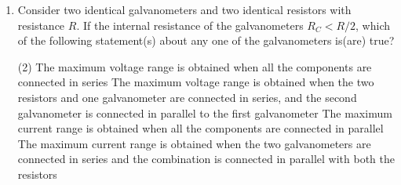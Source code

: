 
\begin{enumerate}
    \item Consider two identical galvanometers and two identical resistors with resistance \( R \). If the internal resistance of the galvanometers \( R_C < R/2 \), which of the following statement(s) about any one of the galvanometers is(are) true?
        \begin{tasks}(2)
            \task The maximum voltage range is obtained when all the components are connected in series
            \task The maximum voltage range is obtained when the two resistors and one galvanometer are connected in series, and the second galvanometer is connected in parallel to the first galvanometer
            \task The maximum current range is obtained when all the components are connected in parallel
            \task The maximum current range is obtained when the two galvanometers are connected in series and the combination is connected in parallel with both the resistors
        \end{tasks}
\end{enumerate}
